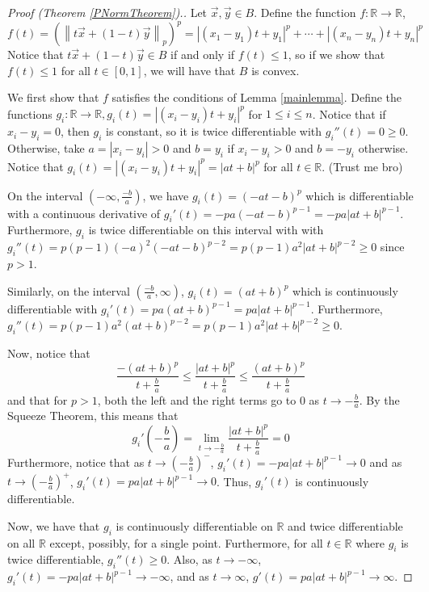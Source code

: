 \documentclass{article}
\newcommand{\R}{\mathbb{R}}
\newcommand{\norm}[1]{\left\|#1\right\|}
\theoremstyle{plain} %
\numberwithin{thm}{section} %
\theoremstyle{definition} %
\begin{document}
\begin{proof}[Proof (Theorem \ref{PNormTheorem}).]
 Let $\vec{x}, \vec{y} \in B$. Define the function $f: \R \to \R$, 
\[
f(t) = (\norm{t\vec{x} + (1 - t)\vec{y}}_p)^p = |(x_1 - y_1)t + y_1|^p + \cdots + |(x_n - y_n)t + y_n|^p
\]
Notice that $t\vec{x} + (1 - t)\vec{y} \in B$ if and only if $f(t) \leq 1$, so if we show that $f(t) \leq 1$ for all $t \in [0, 1]$, we will have that $B$ is convex.

We first show that $f$ satisfies the conditions of Lemma \ref{mainlemma}. Define the functions $g_i: \R \to \R, g_i(t) = |(x_i - y_i)t + y_i|^p$ for $1 \leq i \leq n$. Notice that if $x_i - y_i = 0$, then $g_i$ is constant, so it is twice differentiable with $g_i''(t) = 0 \geq 0$. Otherwise, take $a = |x_i - y_i| > 0$ and $b = y_i$ if $x_i - y_i > 0$ and $b = -y_i$ otherwise. Notice that $g_i(t) = |(x_i - y_i)t + y_i|^p = |at + b|^p$ for all $t \in \R$. (Trust me bro) 

On the interval $(-\infty, \frac{-b}{a})$, we have $g_i(t) = (-at - b)^p$ which is differentiable with a continuous derivative of $g_i'(t) = -pa(-at - b)^{p - 1} = -pa|at + b|^{p - 1}$. Furthermore, $g_i$ is twice differentiable on this interval with with $g_i''(t) = p(p - 1)(-a)^2(-at - b)^{p - 2} = p(p - 1)a^2|at + b|^{p - 2} \geq 0$ since $p > 1$. 

Similarly, on the interval $(\frac{-b}{a}, \infty)$, $g_i(t) = (at + b)^p$ which is continuously differentiable with $g_i'(t) = pa(at + b)^{p - 1} = pa|at + b|^{p - 1}$. Furthermore, $g_i''(t) = p(p - 1)a^2(at + b)^{p - 2} = p(p - 1)a^2|at + b|^{p - 2} \geq 0$.

Now, notice that \[
    \frac{-(at + b)^p}{t + \frac{b}{a}} \leq \frac{|at + b|^p}{t + \frac{b}{a}} \leq \frac{(at + b)^p}{t + \frac{b}{a}}
\]
and that for $p > 1$, both the left and the right terms go to 0 as $t \to -\frac{b}{a}$. By the Squeeze Theorem, this means that
\[
    g_i'\left(-\frac{b}{a}\right) = \lim_{t \to -\frac{b}{a}} \frac{|at + b|^p}{t + \frac{b}{a}} = 0
\]
Furthermore, notice that as $t \to \left(-\frac{b}{a}\right)^-$, $g_i'(t) = -pa|at + b|^{p - 1} \to 0$ and as $t \to \left(-\frac{b}{a}\right)^+$, $g_i'(t) = pa|at + b|^{p - 1} \to 0$. Thus, $g_i'(t)$ is continuously differentiable.

Now, we have that $g_i$ is continuously differentiable on $\R$ and twice differentiable on all $\R$ except, possibly, for a single point. Furthermore, for all $t \in \R$ where $g_i$ is twice differentiable, $g_i''(t) \geq 0$. Also, as $t \to -\infty$, $g_i'(t) = -pa|at + b|^{p - 1} \to -\infty$, and as $t \to \infty$, $g'(t) = pa|at + b|^{p - 1} \to \infty$.


\end{proof}
\end{document}
